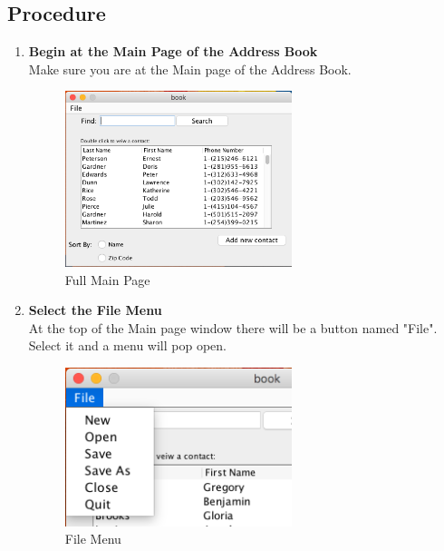 \documentclass[a4paper, 11pt]{article}
\begin{document}
\subsection{Procedure}
\begin{enumerate}[label=\textbf{\arabic*})]
    \item{\textbf{Begin at the Main Page of the Address Book}}\\ Make sure you are at the Main page of the Address Book.
    
    \begin{figure}[h!]
    \centering
      \includegraphics[width=250]{main_page_full.png}
      \caption{Full Main Page}
    \end{figure}
    
    \item{\textbf{Select the File Menu}}\\ At the top of the Main page window there will be a button named "File". Select it and a menu will pop open.
    
    \begin{figure}[h!]
    \centering
      \includegraphics[width=250]{file_menu.png}
      \caption{File Menu}
    \end{figure} 
    

\end{enumerate}
\end{document}

